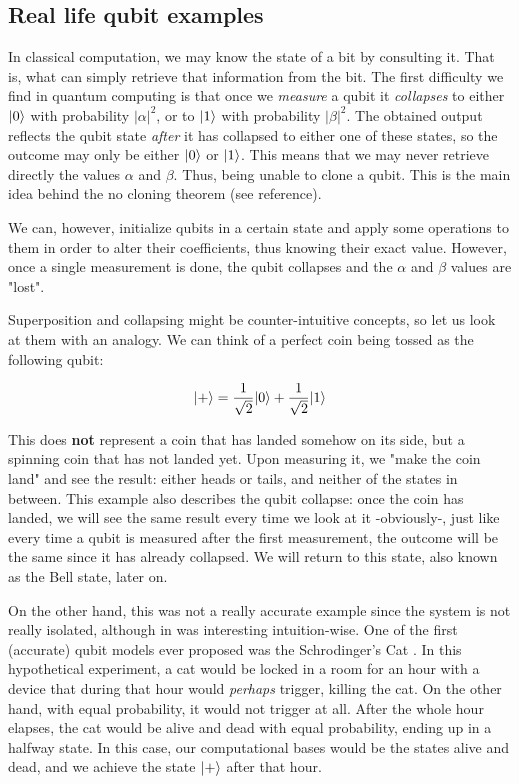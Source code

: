 \subsection{Real life qubit examples}


In classical computation, we may know the state of a bit by consulting it. That is, what can simply retrieve that information from the bit. The first difficulty we find in quantum computing is that once we \emph{measure} a qubit it \emph{collapses} to either $|0\rangle$ with probability $|\alpha|^2$, or to $|1\rangle$ with probability $|\beta|^2$. The obtained output reflects the qubit state \emph{after} it has collapsed to either one of these states, so the outcome may only be either $|0\rangle$ or $|1\rangle$. This means that we may never retrieve directly the values $\alpha$ and $\beta$. Thus, being unable to clone a qubit. This is the main idea behind the no cloning theorem (see reference).

We can, however, initialize qubits in a certain state and apply some operations to them in order to alter their coefficients, thus knowing their exact value. However, once a single measurement is done, the qubit collapses and the $\alpha$ and $\beta$ values are "lost".

Superposition and collapsing might be counter-intuitive concepts, so let us look at them with an analogy. We can think of a perfect coin being tossed as the following qubit:

$$ |+\rangle = \frac{1}{\sqrt{2}} |0\rangle + \frac{1}{\sqrt{2}} |1\rangle $$

This does \textbf{not} represent a coin that has landed somehow on its side, but a spinning coin that has not landed yet. Upon measuring it, we "make the coin land" and see the result: either heads or tails, and neither of the states in between. This example also describes the qubit collapse: once the coin has landed, we will see the same result every time we look at it -obviously-, just like every time a qubit is measured after the first measurement, the outcome will be the same since it has already collapsed. We will return to this state, also known as the Bell state, later on.

On the other hand, this was not a really accurate example since the system is not really isolated, although in was interesting intuition-wise. One of the first (accurate) qubit models ever proposed was the Schrodinger's Cat \cite{Schrodinger1935} \cite{Trimmer1980}. In this hypothetical experiment, a cat would be locked in a room for an hour with a device that during that hour would \emph{perhaps} trigger, killing the cat. On the other hand, with equal probability, it would not trigger at all. After the whole hour elapses, the cat would be alive and dead with equal probability, ending up in a halfway state. In this case, our computational bases would be the states alive and dead, and we achieve the state $|+\rangle$ after that hour.

